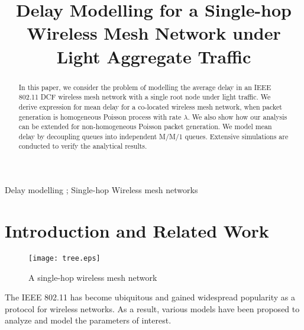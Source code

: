 \documentclass[10pt, conference, compsocconf]{IEEEtran}
\begin{document}
\title{Delay Modelling for a Single-hop Wireless Mesh Network under Light Aggregate Traffic}


\author{
}



\maketitle


\begin{abstract}
In this paper, we consider the problem of modelling the average delay in an IEEE 802.11 DCF wireless mesh network with a single root node under light traffic. We derive expression for mean delay for a co-located wireless mesh network, when packet generation is homogeneous Poisson process with rate $\lambda$. We also show how our analysis can be extended for non-homogeneous Poisson packet generation. We model mean delay by decoupling queues into independent M/M/1 queues. Extensive simulations are conducted to verify the analytical results.	
\end{abstract}

\begin{IEEEkeywords}
Delay modelling ; Single-hop Wireless mesh networks
\end{IEEEkeywords}

\IEEEpeerreviewmaketitle

\section{\large{Introduction and Related Work}}
\label{intro}

\begin{figure}[h]
\centering
\texttt{[image: tree.eps]}
\caption {A single-hop  wireless mesh network}
\label{fig:tree}
\end{figure}

The IEEE 802.11 has become ubiquitous and gained widespread popularity as a protocol for wireless networks. As a result, various models have been proposed to analyze and model the parameters of interest.
\end{document}
